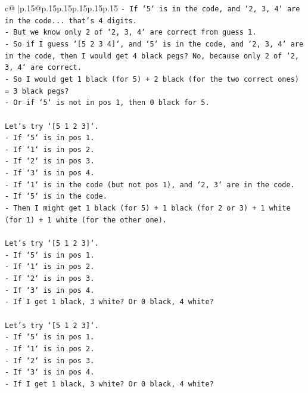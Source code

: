 \documentclass{article}
\begin{document}
{\begin{supertabular}{c@{$\;$}|p{.15\linewidth}@{}p{.15\linewidth}p{.15\linewidth}p{.15\linewidth}p{.15\linewidth}p{.15\linewidth}}
{{{\texttt{{-} If `5` is in the code, and `2, 3, 4` are in the code... that's 4 digits.} \\
\texttt{{-} But we know only 2 of `2, 3, 4` are correct from guess 1.} \\
\texttt{{-} So if I guess `{[}5 2 3 4{]}`, and `5` is in the code, and `2, 3, 4` are in the code, then I would get 4 black pegs? No, because only 2 of `2, 3, 4` are correct.} \\
\texttt{{-} So I would get 1 black (for 5) + 2 black (for the two correct ones) = 3 black pegs?} \\
\texttt{{-} Or if `5` is not in pos 1, then 0 black for 5.} \\
\\ 
\texttt{Let's try `{[}5 1 2 3{]}`.} \\
\texttt{{-} If `5` is in pos 1.} \\
\texttt{{-} If `1` is in pos 2.} \\
\texttt{{-} If `2` is in pos 3.} \\
\texttt{{-} If `3` is in pos 4.} \\
\texttt{{-} If `1` is in the code (but not pos 1), and `2, 3` are in the code.} \\
\texttt{{-} If `5` is in the code.} \\
\texttt{{-} Then I might get 1 black (for 5) + 1 black (for 2 or 3) + 1 white (for 1) + 1 white (for the other one).} \\
\\ 
\texttt{Let's try `{[}5 1 2 3{]}`.} \\
\texttt{{-} If `5` is in pos 1.} \\
\texttt{{-} If `1` is in pos 2.} \\
\texttt{{-} If `2` is in pos 3.} \\
\texttt{{-} If `3` is in pos 4.} \\
\texttt{{-} If I get 1 black, 3 white? Or 0 black, 4 white?} \\
\\ 
\texttt{Let's try `{[}5 1 2 3{]}`.} \\
\texttt{{-} If `5` is in pos 1.} \\
\texttt{{-} If `1` is in pos 2.} \\
\texttt{{-} If `2` is in pos 3.} \\
\texttt{{-} If `3` is in pos 4.} \\
\texttt{{-} If I get 1 black, 3 white? Or 0 black, 4 white?} \\
\\ 
}}}
\end{supertabular}}
\end{document}
